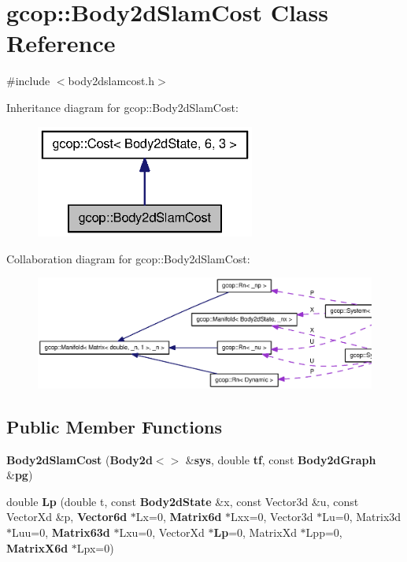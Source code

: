 \section{gcop\-:\-:\-Body2d\-Slam\-Cost \-Class \-Reference}
\label{classgcop_1_1Body2dSlamCost}


{\ttfamily \#include $<$body2dslamcost.\-h$>$}



\-Inheritance diagram for gcop\-:\-:\-Body2d\-Slam\-Cost\-:
\nopagebreak
\begin{figure}[H]
\begin{center}
\leavevmode
\includegraphics[width=204pt]{classgcop_1_1Body2dSlamCost__inherit__graph}
\end{center}
\end{figure}


\-Collaboration diagram for gcop\-:\-:\-Body2d\-Slam\-Cost\-:
\nopagebreak
\begin{figure}[H]
\begin{center}
\leavevmode
\includegraphics[width=350pt]{classgcop_1_1Body2dSlamCost__coll__graph}
\end{center}
\end{figure}
\subsection*{\-Public \-Member \-Functions}
\begin{DoxyCompactItemize}
\item 
{\bf \-Body2d\-Slam\-Cost} ({\bf \-Body2d}$<$$>$ \&{\bf sys}, double {\bf tf}, const {\bf \-Body2d\-Graph} \&{\bf pg})
\item 
double {\bf \-Lp} (double t, const {\bf \-Body2d\-State} \&x, const \-Vector3d \&u, const \-Vector\-Xd \&p, {\bf \-Vector6d} $\ast$\-Lx=0, {\bf \-Matrix6d} $\ast$\-Lxx=0, \-Vector3d $\ast$\-Lu=0, \-Matrix3d $\ast$\-Luu=0, {\bf \-Matrix63d} $\ast$\-Lxu=0, \-Vector\-Xd $\ast${\bf \-Lp}=0, \-Matrix\-Xd $\ast$\-Lpp=0, {\bf \-Matrix\-X6d} $\ast$\-Lpx=0)
\end{DoxyCompactItemize}
